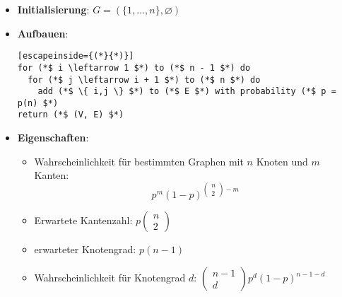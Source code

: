 \begin{itemize}
  \item \textbf{Initialisierung}: $ G = (\{ 1, \dots, n \}, \varnothing) $
  \item \textbf{Aufbauen}:
    \begin{lstlisting}[escapeinside={(*}{*)}]
for (*$ i \leftarrow 1 $*) to (*$ n - 1 $*) do
  for (*$ j \leftarrow i + 1 $*) to (*$ n $*) do
    add (*$ \{ i,j \} $*) to (*$ E $*) with probability (*$ p = p(n) $*)
return (*$ (V, E) $*)
  \end{lstlisting}
  \item \textbf{Eigenschaften}:
  \begin{itemize}
    \item Wahrscheinlichkeit für bestimmten Graphen mit $ n $ Knoten und $ m $ Kanten:
    \begin{equation*}
      p^m(1-p)^{\left( \begin{smallmatrix}
        n \\ 2
      \end{smallmatrix} \right)-m}
    \end{equation*}
    \item Erwartete Kantenzahl: $ p\left( \begin{smallmatrix}
      n \\ 2
    \end{smallmatrix} \right) $
    \item erwarteter Knotengrad: $ p(n-1) $
    \item Wahrscheinlichkeit für Knotengrad $ d $: $ \left( \begin{smallmatrix}
      n-1 \\ d
    \end{smallmatrix} \right)p^d(1-p)^{n-1-d} $
  \end{itemize}
\end{itemize}